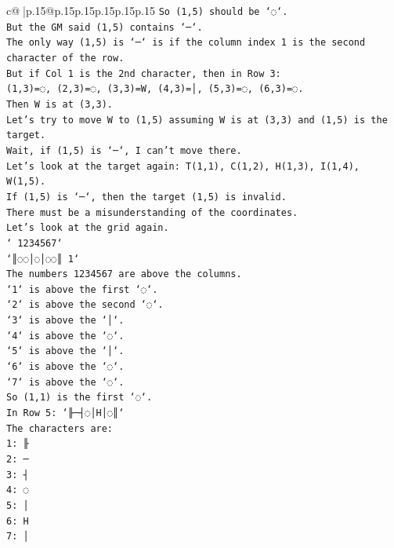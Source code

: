\documentclass{article}
\begin{document}
{\begin{supertabular}{c@{$\;$}|p{.15\linewidth}@{}p{.15\linewidth}p{.15\linewidth}p{.15\linewidth}p{.15\linewidth}p{.15\linewidth}}
{{{\texttt{So (1,5) should be `◌`.} \\
\texttt{But the GM said (1,5) contains `─`.} \\
\texttt{The only way (1,5) is `─` is if the column index 1 is the second character of the row.} \\
\texttt{But if Col 1 is the 2nd character, then in Row 3:} \\
\texttt{(1,3)=◌, (2,3)=◌, (3,3)=W, (4,3)=│, (5,3)=◌, (6,3)=◌.} \\
\texttt{Then W is at (3,3).} \\
\texttt{Let's try to move W to (1,5) assuming W is at (3,3) and (1,5) is the target.} \\
\texttt{Wait, if (1,5) is `─`, I can't move there.} \\
\texttt{Let's look at the target again: T(1,1), C(1,2), H(1,3), I(1,4), W(1,5).} \\
\texttt{If (1,5) is `─`, then the target (1,5) is invalid.} \\
\texttt{There must be a misunderstanding of the coordinates.} \\
\texttt{Let's look at the grid again.} \\
\texttt{` 1234567`} \\
\texttt{`║◌◌│◌│◌◌║ 1`} \\
\texttt{The numbers 1234567 are above the columns.} \\
\texttt{`1` is above the first `◌`.} \\
\texttt{`2` is above the second `◌`.} \\
\texttt{`3` is above the `│`.} \\
\texttt{`4` is above the `◌`.} \\
\texttt{`5` is above the `│`.} \\
\texttt{`6` is above the `◌`.} \\
\texttt{`7` is above the `◌`.} \\
\texttt{So (1,1) is the first `◌`.} \\
\texttt{In Row 5: `╟─┤◌│H│◌║`} \\
\texttt{The characters are:} \\
\texttt{1: ╟} \\
\texttt{2: ─} \\
\texttt{3: ┤} \\
\texttt{4: ◌} \\
\texttt{5: │} \\
\texttt{6: H} \\
\texttt{7: │} \\
}}}
\end{supertabular}}
\end{document}
